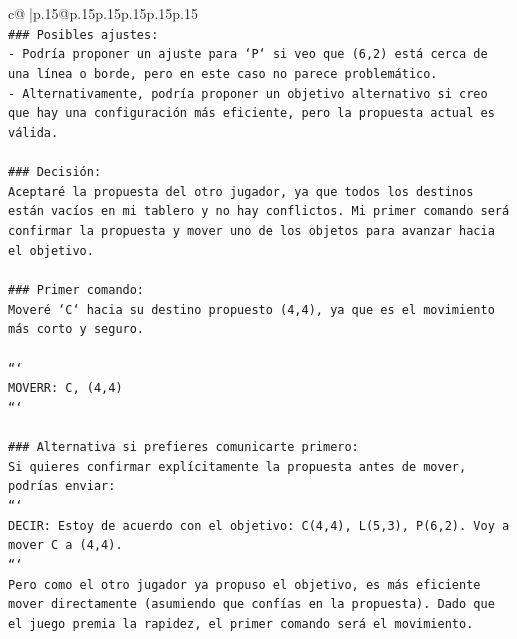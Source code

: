 \documentclass{article}
\begin{document}
{\begin{supertabular}{c@{$\;$}|p{.15\linewidth}@{}p{.15\linewidth}p{.15\linewidth}p{.15\linewidth}p{.15\linewidth}p{.15\linewidth}}
{{{\\ 
\texttt{\#\#\# Posibles ajustes:} \\
\texttt{{-} Podría proponer un ajuste para `P` si veo que (6,2) está cerca de una línea o borde, pero en este caso no parece problemático.} \\
\texttt{{-} Alternativamente, podría proponer un objetivo alternativo si creo que hay una configuración más eficiente, pero la propuesta actual es válida.} \\
\\ 
\texttt{\#\#\# Decisión:} \\
\texttt{Aceptaré la propuesta del otro jugador, ya que todos los destinos están vacíos en mi tablero y no hay conflictos. Mi primer comando será confirmar la propuesta y mover uno de los objetos para avanzar hacia el objetivo.} \\
\\ 
\texttt{\#\#\# Primer comando:} \\
\texttt{Moveré `C` hacia su destino propuesto (4,4), ya que es el movimiento más corto y seguro.} \\
\\ 
\texttt{```} \\
\texttt{MOVERR: C, (4,4)} \\
\texttt{```} \\
\\ 
\texttt{\#\#\# Alternativa si prefieres comunicarte primero:} \\
\texttt{Si quieres confirmar explícitamente la propuesta antes de mover, podrías enviar:} \\
\texttt{```} \\
\texttt{DECIR: Estoy de acuerdo con el objetivo: C(4,4), L(5,3), P(6,2). Voy a mover C a (4,4).} \\
\texttt{```} \\
\texttt{Pero como el otro jugador ya propuso el objetivo, es más eficiente mover directamente (asumiendo que confías en la propuesta). Dado que el juego premia la rapidez, el primer comando será el movimiento.} \\
            }
        }
    }
     \\ \\


\end{supertabular}}
\end{document}
